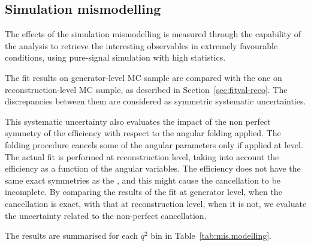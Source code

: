 


\subsection{Simulation mismodelling}
\label{sec:sys-mismodel}

The effects of the simulation mismodelling is measured through the capability of the analysis to retrieve the interesting observables in extremely favourable conditions, using pure-signal simulation with high statistics.

The fit results on generator-level MC sample are compared with the one on reconstruction-level MC sample, as described in Section~\ref{sec:fitval-reco}.
The discrepancies between them are considered as symmetric systematic uncertainties.

This systematic uncertainty also evaluates the impact of the non perfect symmetry of the efficiency with respect to the angular folding applied.
The folding procedure cancels some of the angular parameters only if applied at \pdf level.
The actual fit is performed at reconstruction level, taking into account the efficiency as a function of the angular variables.
The efficiency does not have the same exact symmetries as the \pdf, and this might cause the cancellation to be incomplete.
By comparing the results of the fit at generator level, when the cancellation is exact, with that at reconstruction level, when it is not, we evaluate the uncertainty related to the non-perfect cancellation.

The results are summarised for each $q^2$ bin in Table~\ref{tab:mis.modelling}.

